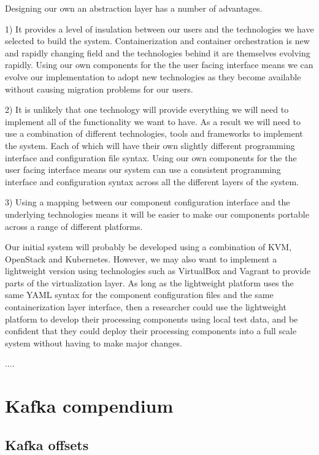 \documentclass{article}
\newcommand{\yaml} {YAML\xspace}
\newcommand{\openstack} {OpenStack\xspace}
\newcommand{\kubernetes} {Kubernetes\xspace}
\newcommand{\virtualbox} {VirtualBox\xspace}
\newcommand{\vagrant} {Vagrant\xspace}
\newcommand{\kvm} {KVM\xspace}
\begin{document}
Designing our own an abstraction layer has a number of advantages.

1) It provides a level of insulation between our users and the technologies we have selected to build the system. Containerization and container orchestration is new and rapidly changing field and the technologies behind it are themselves evolving rapidly.
Using our own components for the the user facing interface means we can evolve our implementation to adopt new technologies as they become available without causing migration problems for our users.

2) It is unlikely that one technology will provide everything we will need to implement all of the functionality we want to have. As a result we will need to use a combination of different technologies, tools and frameworks to implement the system. Each of which will have their own slightly different programming interface and configuration file syntax.
Using our own components for the the user facing interface means our system can use a consistent programming interface and configuration syntax across all the different layers of the system.

3) Using a mapping between our component configuration interface and the underlying technologies means it will be easier to make our components portable across a range of different platforms.

Our initial system will probably be developed using a combination of \kvm, \openstack and \kubernetes. However, we may also want to implement a lightweight version using technologies such as \virtualbox and \vagrant to provide parts of the virtualization layer.
As long as the lightweight platform uses the same \yaml syntax for the component configuration files and the same containerization layer interface, then a researcher could use the lightweight platform to develop their processing components using local test data, and be confident that they could deploy their processing components into a full scale system without having to make major changes.



....



\section{Kafka compendium}
\label{kafka-compendium}

\subsection{Kafka offsets}
\label{kafka-offsets}
\end{document}
